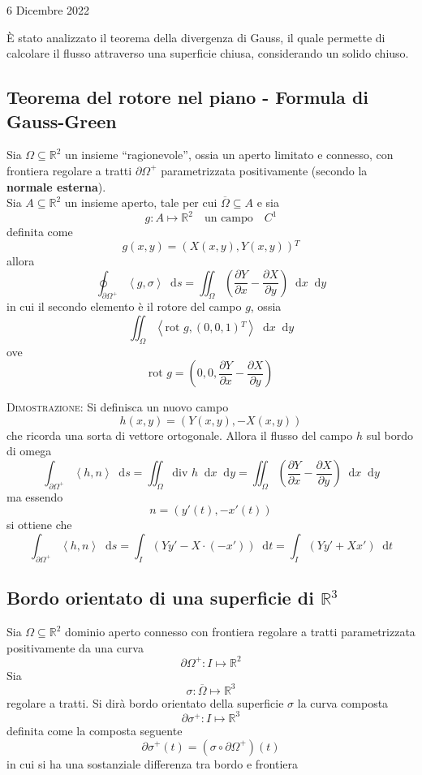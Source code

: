 \documentclass[a4paper]{extarticle}
\newcommand{\quotes}[1]{``#1''}
\newcommand*\dif{\mathop{}\!\mathrm{d}}
\begin{document}
\newpage
\noindent
\begin{center}
    6 Dicembre 2022
\end{center}
È stato analizzato il teorema della divergenza di Gauss, il quale permette di calcolare il flusso attraverso una superficie chiusa, considerando un solido chiuso.

\vspace{2em}
\noindent
\subsection{Teorema del rotore nel piano - Formula di Gauss-Green}
Sia $\Omega \subseteq \mathbb{R}^2$ un insieme \quotes{ragionevole}, ossia un aperto limitato e connesso, con frontiera regolare a tratti $\partial \Omega^+$ parametrizzata positivamente (secondo la \textbf{normale esterna}).\\
Sia $A \subseteq \mathbb{R}^2$ un insieme aperto, tale per cui $\overline{\Omega} \subseteq A$ e sia
\[g : A \longmapsto \mathbb{R}^2 \hspace{1em} \text{un campo} \hspace{1em} C^1\]
definita come
\[g(x,y) = \left(X(x,y),Y(x,y)\right){^T}\]
allora
\[\oint_{\partial \Omega^+} \left<g,\sigma\right> \dif s = \iint_{\Omega} \left(\dfrac{\partial Y}{\partial x} - \dfrac{\partial X}{\partial y}\right) \dif x \dif y\]
in cui il secondo elemento è il rotore del campo $g$, ossia
\[\iint_{\Omega} \left<\text{rot } g, (0,0,1){^T}\right> \dif x \dif y\]
ove
\[\text{rot } g = \left(0,0,\dfrac{\partial Y}{\partial x} - \dfrac{\partial X}{\partial y}\right)\]

\vspace{2em}
\noindent
\normalfont \normalsize
\textsc{Dimostrazione}: Si definisca un nuovo campo
\[h(x,y) = \left(Y(x,y),-X(x,y)\right)\]
che ricorda una sorta di vettore ortogonale. Allora il flusso del campo $h$ sul bordo di omega
\[\int_{\partial \Omega^+} \left<h,n\right> \dif s = \iint_{\Omega} \text{div } h \dif x \dif y = \iint_{\Omega} \left(\dfrac{\partial Y}{\partial x} - \dfrac{\partial X}{\partial y}\right) \dif x \dif y\]
ma essendo
\[n=\left(y'(t),-x'(t)\right)\]
si ottiene che
\[\int_{\partial \Omega^+} \left<h,n\right> \dif s = \int_I \left(Y y' - X \cdot (- x')\right) \dif t = \int_I \left(Yy' + Xx'\right) \dif t\]

\vspace{1em}
\subsection{Bordo orientato di una superficie di $\mathbb{R}^3$}
Sia $\Omega \subseteq \mathbb{R}^2$ dominio aperto connesso con frontiera regolare a tratti parametrizzata positivamente da una curva
\[\partial \Omega^+ : I \longmapsto \mathbb{R}^2\]
Sia
\[\sigma : \overline{\Omega} \longmapsto \mathbb{R}^3\]
regolare a tratti. Si dirà bordo orientato della superficie $\sigma$ la curva composta
\[\partial \sigma^+ : I \longmapsto \mathbb{R}^3\]
definita come la composta seguente
\[\partial \sigma^+ (t) = \left(\sigma \circ \partial \Omega^+\right)(t)\]
in cui si ha una sostanziale differenza tra bordo e frontiera
\end{document}
